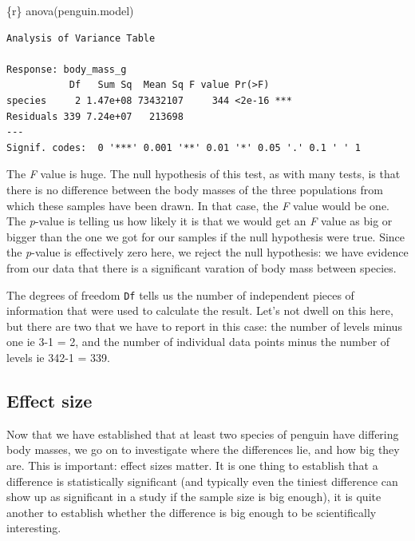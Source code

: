 \documentclass[
  letterpaper,
  DIV=11,
  numbers=noendperiod]{scrreprt}
\newenvironment{Shaded}{\begin{snugshade}}{\end{snugshade}}
\newcommand{\InformationTok}[1]{\textcolor[rgb]{0.37,0.37,0.37}{#1}}
\begin{document}
\begin{Shaded}
\begin{Highlighting}[]
\InformationTok{\textasciigrave{}\textasciigrave{}\textasciigrave{}\{r\}}
\InformationTok{anova(penguin.model)}
\InformationTok{\textasciigrave{}\textasciigrave{}\textasciigrave{}}
\end{Highlighting}
\end{Shaded}

\begin{verbatim}
Analysis of Variance Table

Response: body_mass_g
           Df   Sum Sq  Mean Sq F value Pr(>F)    
species     2 1.47e+08 73432107     344 <2e-16 ***
Residuals 339 7.24e+07   213698                   
---
Signif. codes:  0 '***' 0.001 '**' 0.01 '*' 0.05 '.' 0.1 ' ' 1
\end{verbatim}

The \emph{F} value is huge. The null hypothesis of this test, as with
many tests, is that there is no difference between the body masses of
the three populations from which these samples have been drawn. In that
case, the \emph{F} value would be one. The \emph{p}-value is telling us
how likely it is that we would get an \emph{F} value as big or bigger
than the one we got for our samples if the null hypothesis were true.
Since the \emph{p}-value is effectively zero here, we reject the null
hypothesis: we have evidence from our data that there is a significant
varation of body mass between species.

The degrees of freedom \texttt{Df} tells us the number of independent
pieces of information that were used to calculate the result. Let's not
dwell on this here, but there are two that we have to report in this
case: the number of levels minus one ie 3-1 = 2, and the number of
individual data points minus the number of levels ie 342-1 = 339.

\subsection{Effect size}\label{effect-size}

Now that we have established that at least two species of penguin have
differing body masses, we go on to investigate where the differences
lie, and how big they are. This is important: effect sizes matter. It is
one thing to establish that a difference is statistically significant
(and typically even the tiniest difference can show up as significant in
a study if the sample size is big enough), it is quite another to
establish whether the difference is big enough to be scientifically
interesting.
\end{document}
